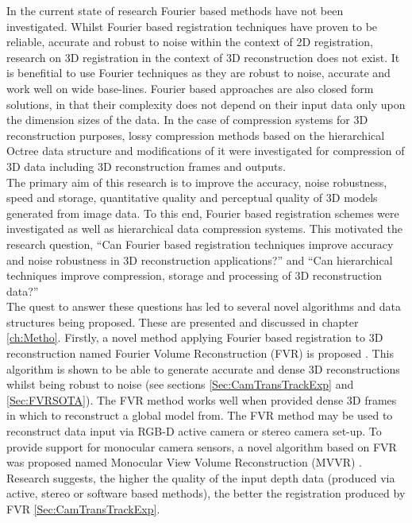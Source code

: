 In the current state of research Fourier based methods have not been investigated. Whilst Fourier based registration techniques have proven to be reliable, accurate and robust to noise within the context of 2D registration, research on 3D registration in the context of 3D reconstruction does not exist. It is benefitial to use Fourier techniques as they are robust to noise, accurate and work well on wide base-lines. Fourier based approaches are also closed form solutions, in that their complexity does not depend on their input data only upon the dimension sizes of the data. In the case of compression systems for 3D reconstruction purposes, lossy compression methods based on the hierarchical Octree data structure and modifications of it \cite{Lincoln13Interpolating} were investigated for compression of 3D data including 3D reconstruction frames and outputs. \\

The primary aim of this research is to improve the accuracy, noise robustness, speed and storage, quantitative quality and perceptual quality of 3D models generated from image data. To this end, Fourier based registration schemes were investigated as well as hierarchical data compression systems. This motivated the research question, ``Can Fourier based registration techniques improve accuracy and noise robustness in 3D reconstruction applications?'' and ``Can hierarchical techniques improve compression, storage and processing of 3D reconstruction data?'' \\

The quest to answer these questions has led to several novel algorithms and data structures being proposed. These are presented and discussed in chapter \ref{ch:Metho}. Firstly, a novel method applying Fourier based registration to 3D reconstruction named Fourier Volume Reconstruction (FVR) is proposed \cite{Lincoln16Fourier,Lincoln16Dense}. This algorithm is shown to be able to generate accurate and dense 3D reconstructions whilst being robust to noise (see sections \ref{Sec:CamTransTrackExp} and \ref{Sec:FVRSOTA}). The FVR method works well when provided dense 3D frames in which to reconstruct a global model from. The FVR method may be used to reconstruct data input via RGB-D active camera or stereo camera set-up. To provide support for monocular camera sensors, a novel algorithm based on FVR was proposed named Monocular View Volume Reconstruction (MVVR) \cite{Lincoln16Monocular}. Research suggests, the higher the quality of the input depth data (produced via active, stereo or software based methods), the better the registration produced by FVR \ref{Sec:CamTransTrackExp}. \\

